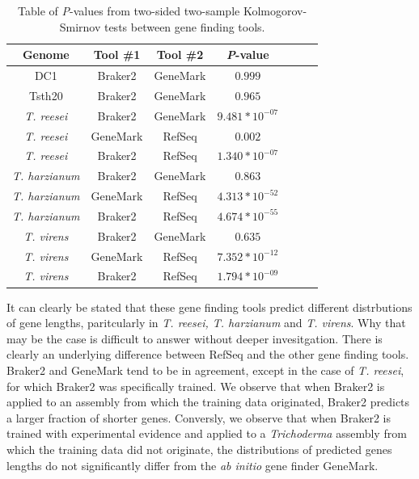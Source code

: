 \begin{table}
  \begin{center}
    \begin{tabular}{|c|c|c|c|c|c|c|}
      \hline
      Genome & Tool \#1 & Tool \#2 & \textit{P}-value  \\ \hline
      DC1 & Braker2 & GeneMark & $0.999$ \\ \hline
      Tsth20 & Braker2 & GeneMark & $0.965$ \\ \hline
      \textit{T. reesei} & Braker2 & GeneMark & $9.481*10^{-07}$ \\ \hline
      \textit{T. reesei} & GeneMark & RefSeq & $0.002$ \\ \hline
      \textit{T. reesei} & Braker2 & RefSeq & $1.340*10^{-07}$ \\ \hline
      \textit{T. harzianum} & Braker2 & GeneMark & $0.863$ \\ \hline
      \textit{T. harzianum} & GeneMark & RefSeq & $4.313*10^{-52}$ \\ \hline
      \textit{T. harzianum} & Braker2 & RefSeq & $4.674*10^{-55}$ \\ \hline
      \textit{T. virens} & Braker2 & GeneMark & $0.635$ \\ \hline
      \textit{T. virens} & GeneMark & RefSeq & $7.352*10^{-12}$ \\ \hline
      \textit{T. virens} & Braker2 & RefSeq & $1.794*10^{-09}$ \\ \hline
    \end{tabular}
  \end{center}
  \caption{Table of \textit{P}-values from two-sided two-sample
    Kolmogorov-Smirnov tests between gene finding tools.}
  \label{table:ks-2s}
\end{table}

It can clearly be stated that these gene finding tools predict
different distrbutions of gene lengths, paritcularly in
\textit{T. reesei, T. harzianum} and \textit{T. virens}. Why that may
be the case is difficult to answer without deeper invesitgation. There
is clearly an underlying difference between RefSeq and the other gene
finding tools. Braker2 and GeneMark tend to be in agreement, except in
the case of \textit{T. reesei}, for which Braker2 was specifically
trained. We observe that when Braker2 is applied to an assembly from
which the training data originated, Braker2 predicts a larger fraction
of shorter genes. Conversly, we observe that when Braker2 is trained
with experimental evidence and applied to a \textit{Trichoderma}
assembly from which the training data did not originate, the
distributions of predicted genes lengths do not significantly differ
from the \textit{ab initio} gene finder GeneMark.
